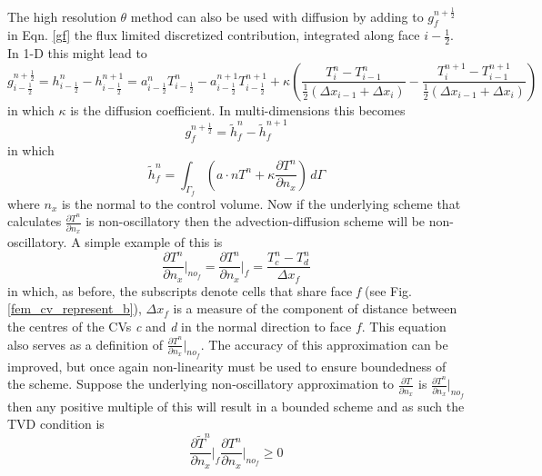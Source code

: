 The high resolution $\theta$ method can also be used with diffusion by adding to $g_{f}^{n+\frac{1}{2}}$ in Eqn. \ref{gf} the flux limited discretized contribution, integrated along face $i-\frac{1}{2}$.
In 1-D this might lead to
\begin{displaymath}
g_{i-\frac{1}{2}}^{n+\frac{1}{2}} = h_{i-\frac{1}{2}}^n-h_{i-\frac{1}{2}}^{n+1}
= a_{i-\frac{1}{2}}^n T_{i-\frac{1}{2}}^n -
a_{i-\frac{1}{2}}^{n+1} T_{i-\frac{1}{2}}^{n+1} + \kappa \left(
\frac{T_{i}^n-T_{i-1}^n}{\frac{1}{2}(\Delta x_{i-1}+\Delta x_i )}
- \frac{T_{i}^{n+1}-T_{i-1}^{n+1}}{\frac{1}{2}(\Delta
x_{i-1}+\Delta x_i )}\right)
\end{displaymath}
in which $\kappa$ is the diffusion coefficient. In multi-dimensions this becomes
\begin{displaymath}
g_{f}^{n+\frac{1}{2}} = \tilde h_{f}^n-\tilde h_{f}^{n+1}
\end{displaymath}
in which
\begin{equation}
\tilde{h}_{f}^{n} = \int_{\Gamma_f} \left( a \cdot n T^{n}
+ \kappa \frac{\partial T^n}{\partial n_x} \right) \,d\Gamma
\label{16a}
\end{equation}
where $n_x$ is the normal to the control volume. Now if the underlying scheme that calculates $\frac{\partial T^n}{\partial n_x}$ is non-oscillatory then the advection-diffusion scheme will be non-oscillatory. A simple example of this is
\begin{displaymath}
\frac{\partial T^n}{\partial n_x}\Big\vert_{no_f} = \frac{\partial T^n}{\partial n_x} \Big\vert_{f} = \frac{T_{c}^{n} - T_{d}^{n}}{\Delta x_{f}}
\end{displaymath}
in which, as before, the subscripts denote cells that share face \textit{f} (see Fig. \ref{fem_cv_represent_b}), $\Delta x_{f}$ is a measure of the component of distance between the centres of the CVs \textit{c} and \textit{d} in the normal direction to face $f$. This equation also serves as a definition of $\frac{\partial T^{n}}{\partial n_x}\vert_{no_f}$. The accuracy of this approximation can be improved, but once again non-linearity must be used to ensure boundedness of the scheme. Suppose the underlying non-oscillatory approximation to $\frac{\partial T}{\partial n_x}$ is $\frac{\partial T^n}{\partial n_x}\vert_{no_f}$ then any positive multiple of this will result in a bounded scheme and as such the TVD condition is
\begin{displaymath}
{\frac{\partial \widetilde{T}^{n}}{\partial n_x}\Big\vert_{f}
\frac{\partial T^{n}}{\partial n_x}\Big\vert_{no_f}} \geq 0
\end{displaymath}
